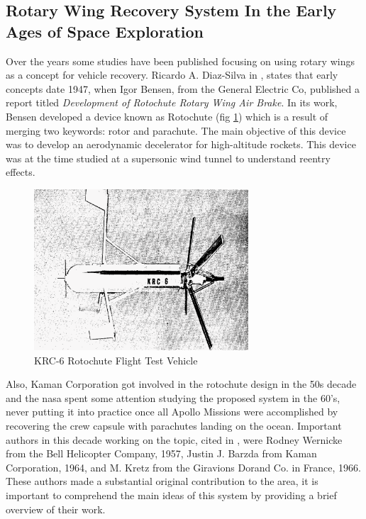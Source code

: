 \subsection{Rotary Wing Recovery System In the Early Ages of Space Exploration}

Over the years some studies have been published focusing on using rotary wings as a concept for vehicle recovery. Ricardo A. Diaz-Silva in \cite{diaz-silva_rotary_2013}, states that early concepts date 1947, when Igor Bensen, from the General Electric Co, published a report titled \textit{Development of Rotochute Rotary Wing Air Brake}. In its work, Bensen developed a device known as Rotochute (fig \ref{fig:rotochute_prototype}) which is a result of merging two keywords: rotor and parachute. The main objective of this device was to develop an aerodynamic decelerator for high-altitude rockets. This device was at the time studied at a supersonic wind tunnel to understand reentry effects. 

\begin{figure}[!htb]
    \centering
    \includegraphics[width=8cm]{Figures/introduction/rotochute_prototype.eps}
    \caption{KRC-6 Rotochute Flight Test Vehicle}
    \label{fig:rotochute_prototype}
\end{figure}

Also, Kaman Corporation got involved in the rotochute design in the 50s decade and the \gls{nasa} spent some attention studying the proposed system in the 60's, never putting it into practice once all Apollo Missions \cite{noauthor_apollo_nodate} were accomplished by recovering the crew capsule with parachutes landing on the ocean. Important authors in this decade working on the topic, cited in \cite{diaz-silva_rotary_2013}, were Rodney Wernicke from the Bell Helicopter Company, 1957, Justin J. Barzda from Kaman Corporation, 1964, and M. Kretz from the Giravions Dorand Co. in France, 1966. These authors made a substantial original contribution to the area, it is important to comprehend the main ideas of this system by providing a brief overview of their work.

